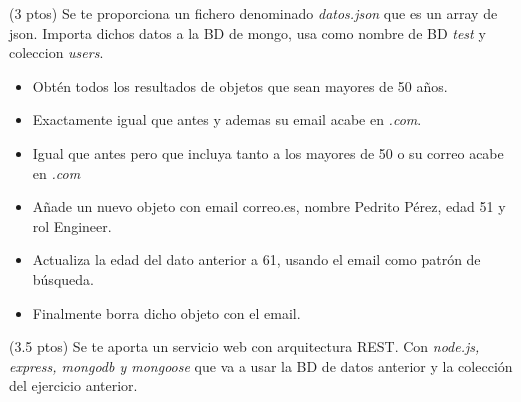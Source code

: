 \documentclass[addpoints,12pt]{exam}
\begin{document}
\begin{questions}
\newpage

\question(3 ptos) Se te proporciona un fichero denominado \emph{datos.json} que es un array de json. Importa dichos datos a la BD de mongo, usa como nombre de BD \emph{test} y coleccion \emph{users}.
\begin{itemize}
\item Obtén todos los resultados de objetos que sean mayores de 50 años.
\item Exactamente igual que antes y ademas su email acabe en \emph{.com}.
\item Igual que antes pero que incluya tanto a los mayores de 50 o su correo acabe en \emph{.com}
\item Añade un nuevo objeto con email correo\@correo.es, nombre Pedrito Pérez, edad 51 y rol Engineer.
\item Actualiza la edad del dato anterior a 61, usando el email como patrón de búsqueda.
\item Finalmente borra dicho objeto con el email.
\end{itemize}

\question(3.5 ptos) Se te aporta un servicio web con arquitectura REST. Con \emph{node.js, express, mongodb y mongoose} que va a usar la BD de datos anterior y la colección del ejercicio anterior.
\end{questions}
\end{document}
